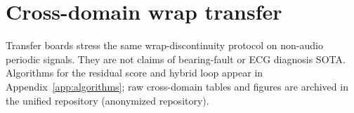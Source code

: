 \section{Cross-domain wrap transfer}
\label{app:transfer-bundle}

Transfer boards stress the same wrap-discontinuity protocol on non-audio periodic signals.
They are not claims of bearing-fault or ECG diagnosis SOTA.
Algorithms for the residual score and hybrid loop appear in Appendix~\ref{app:algorithms}; raw cross-domain tables and figures are archived in the unified repository (anonymized repository).



